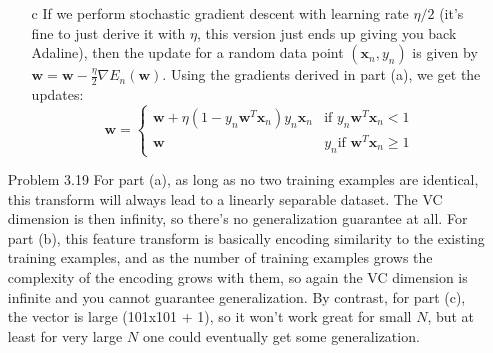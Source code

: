\documentclass[10pt]{article}
\begin{document}
\begin{enumerate}
\begin{itemize}
  \item[c] If we perform stochastic gradient descent with learning
    rate $\eta / 2$ (it's fine to just derive it with $\eta$, this
    version just ends up giving you back Adaline), then the update for
    a random data point $(\mathbf{x}_n, y_n)$ is given by $\mathbf{w}
    = \mathbf{w} - \frac{\eta}{2} \nabla E_n (\mathbf{w})$. Using the
    gradients derived in part (a), we get the updates:
    \[ \mathbf{w} = 
      \begin{cases}
        \mathbf{w} + \eta(1-y_n \mathbf{w}^T \mathbf{x}_n)y_n
        \mathbf{x}_n & \text{if } y_n \mathbf{w}^T \mathbf{x}_n < 1 \\
        \mathbf{w} & y_n \text{if } \mathbf{w}^T \mathbf{x}_n \geq 1
      \end{cases}
    \]

  \end{itemize}

\item[Problem 3.19] For part (a), as long as no two training examples
  are identical, this transform will always lead to a linearly
  separable dataset. The VC dimension is then infinity, so there's no
  generalization guarantee at all. For part (b), this feature
  transform is basically encoding similarity to the existing training
  examples, and as the number of training examples grows the
  complexity of the encoding grows with them, so again the VC
  dimension is infinite and you cannot guarantee generalization. By
  contrast, for part (c), the vector is large (101x101 + 1), so it
  won't work great for small $N$, but at least for very large $N$ one
  could eventually get some generalization.



\end{enumerate}
\end{document}
